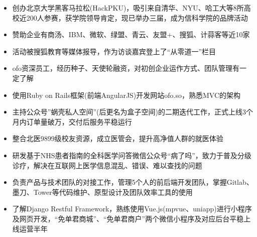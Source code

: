 \documentclass{resume}
\begin{document}
\begin{itemize}[parsep=0.5ex]
  \item 创办北京大学黑客马拉松(HackPKU)，吸引来自清华、NYU、哈工大等8所高校近200人参赛，获学院领导肯定，现已举办三届，成为信科学院的品牌活动
  \item 赞助企业有商汤、IBM、微软、绿盟、青云、友盟+、搜狐、计蒜客等近10家
  \item 活动被搜狐教育等媒体报导，作为访谈嘉宾登上了“从零道一”栏目
\end{itemize}


\begin{itemize}[parsep=0.5ex]
  \item ofo资深员工，经历种子、天使轮融资，对初创企业运作方式、团队管理有一定了解
  \item 使用Ruby on Rails框架(前端AngularJS)开发网站ofo.so，熟悉MVC的架构
\end{itemize}


\begin{itemize}[parsep=0.5ex]
  \item 主持公众号”蜗壳私人空间”(后更名为盒子空间)的二期迭代工作，正式上线3个月内订单量破万，交付后服务平稳运行
\end{itemize}



\begin{itemize}[parsep=0.5ex]
  \item 整合北医9899级校友资源，成立医管会，提升高净值人群的就医体验
  \item 研发基于NHS患者指南的全科医学问答微信公众号“病了吗”，致力于普及分级诊疗，解决在互联网上医学信息混乱、错误、难以查找的问题
\end{itemize}



\begin{itemize}[parsep=0.5ex]
	\item 负责产品与技术团队的对接工作，管理5个人的前后端开发团队，掌握Gitlab、墨刀、Tower等代码维护、原型设计及团队效率工具的使用
    \item 了解Django Restful Framework，熟练使用Vue.js(mpvue、uniapp)进行小程序及网页开发，“免单君商城”、“免单君商户”两个微信小程序及对应后台平稳上线运营半年
\end{itemize}
\end{document}
